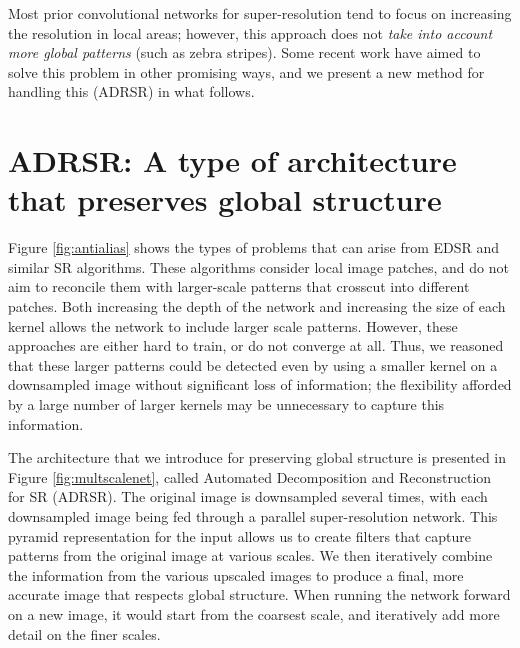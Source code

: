 \documentclass[10pt,twocolumn,letterpaper]{article}
\begin{document}
Most prior convolutional networks for super-resolution tend to focus on increasing the resolution in local areas; however, this approach does not \textit{take into account more global patterns} (such as zebra stripes). Some recent work \cite{upanddown,zssr} have aimed to solve this problem in other promising ways, and we present a new method for handling this (ADRSR) in what follows.





\section{ADRSR: A type of architecture that preserves global structure}

Figure \ref{fig:antialias} shows the types of problems that can arise from EDSR and similar SR algorithms. These algorithms consider local image patches, and do not aim to reconcile them with larger-scale patterns that crosscut into different patches.
Both increasing the depth of the network and increasing the size of each kernel allows the network to include larger scale patterns. However, these approaches are either hard to train, or do not converge at all. Thus, we reasoned that these larger patterns could be detected even by using a smaller kernel on a downsampled image without significant loss of information; the flexibility afforded by a large number of larger kernels may be unnecessary to capture this information.

The architecture that we introduce for preserving global structure is presented in Figure \ref{fig:multscalenet}, called Automated Decomposition and Reconstruction for SR (ADRSR). The original image is downsampled several times, with each downsampled image being fed through a parallel super-resolution network. This pyramid representation for the input allows us to create filters that capture patterns from the original image at various scales. We then iteratively combine the information from the various upscaled images to produce a final, more accurate image that respects global structure. When running the network forward on a new image, it would start from the coarsest scale, and iteratively add more detail on the finer scales. 
\end{document}
